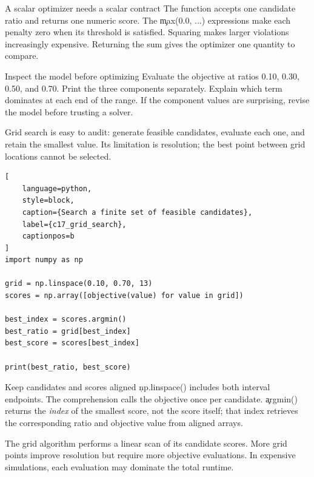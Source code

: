 \begin{SyntaxBox}{A scalar optimizer needs a scalar contract}
The function accepts one candidate ratio and returns one numeric score. The
\c{max(0.0, ...)} expressions make each penalty zero when its threshold is
satisfied. Squaring makes larger violations increasingly expensive. Returning
the sum gives the optimizer one quantity to compare.
\end{SyntaxBox}

\begin{TryBox}{Inspect the model before optimizing}
Evaluate the objective at ratios 0.10, 0.30, 0.50, and 0.70. Print the three
components separately. Explain which term dominates at each end of the range.
If the component values are surprising, revise the model before trusting a
solver.
\end{TryBox}


Grid search is easy to audit: generate feasible candidates, evaluate each one,
and retain the smallest value. Its limitation is resolution; the best point
between grid locations cannot be selected.

\begin{lstlisting}[
    language=python,
    style=block,
    caption={Search a finite set of feasible candidates},
    label={c17_grid_search},
    captionpos=b
]
import numpy as np

grid = np.linspace(0.10, 0.70, 13)
scores = np.array([objective(value) for value in grid])

best_index = scores.argmin()
best_ratio = grid[best_index]
best_score = scores[best_index]

print(best_ratio, best_score)
\end{lstlisting}

\begin{SyntaxBox}{Keep candidates and scores aligned}
\c{np.linspace()} includes both interval endpoints. The comprehension calls the
objective once per candidate. \c{argmin()} returns the \emph{index} of the
smallest score, not the score itself; that index retrieves the corresponding
ratio and objective value from aligned arrays.
\end{SyntaxBox}

The grid algorithm performs a linear scan of its candidate scores. More grid
points improve resolution but require more objective evaluations. In expensive
simulations, each evaluation may dominate the total runtime.

